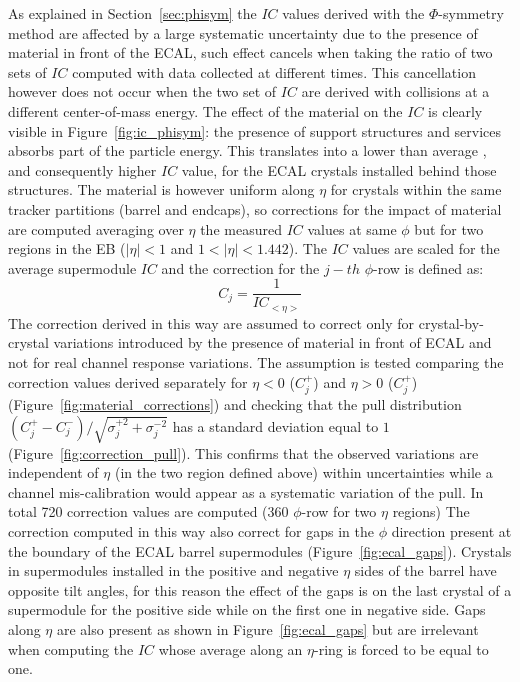 As explained in Section~\ref{sec:phisym} the $IC$ values derived with the $\Phi$-symmetry method are affected by
a large systematic uncertainty due to the presence of material in front of the ECAL, such effect cancels when taking
the ratio of two sets of $IC$ computed with data collected at different times. This cancellation however does not occur
when the two set of $IC$ are derived with collisions at a different center-of-mass energy.
The effect of the material on the $IC$ is clearly visible in Figure~\ref{fig:ic_phisym}:
the presence of support structures and services
absorbs part of the particle energy. This translates into a lower than average \sumEt, and consequently higher $IC$ value,
for the ECAL crystals installed behind those structures. The material is however uniform along $\eta$ for crystals within 
the same tracker partitions (barrel and endcaps), so corrections for the impact of material are computed averaging
over $\eta$ the measured $IC$ values at same $\phi$ but for two regions in the EB ($|\eta|<1$ and $1<|\eta|<1.442$).
The $IC$ values are scaled for the average supermodule $IC$ and the correction for the $j-th$ $\phi$-row is defined as:
\[
C_j = \frac{1}{IC_{<\eta >}}
\]
The correction derived in this way are assumed to correct only for crystal-by-crystal variations introduced by the
presence of material in front of ECAL and not for real channel response variations.
The assumption is tested
comparing the correction values derived separately for $\eta <0$ ($C_j^+$) and $\eta > 0$ ($C_j^+$)
(Figure~\ref{fig:material_corrections})
and checking that the pull distribution $(C_j^+ - C_j^-)/\sqrt{\sigma_j^{+ 2}+\sigma_j^{- 2}}$
has a standard deviation equal to $1$ (Figure~\ref{fig:correction_pull}). This confirms that the observed variations
are independent of $\eta$ (in the two region defined above) within uncertainties while a channel mis-calibration
would appear as a systematic variation of the pull.
In total 720 correction values are computed (360 $\phi$-row for two $\eta$ regions) 
The correction computed in this way also correct for gaps in the $\phi$ direction present at the boundary of the ECAL barrel
supermodules (Figure~\ref{fig:ecal_gaps}). Crystals in supermodules installed in the positive and negative $\eta$ sides of the barrel
have opposite tilt angles, for this reason the effect of the gaps is on the last crystal of a supermodule for the positive
side while on the first one in negative side.
Gaps along $\eta$ are also present as shown in Figure~\ref{fig:ecal_gaps} but are irrelevant when computing
the $IC$ whose average along an $\eta$-ring is forced to be equal to one.

